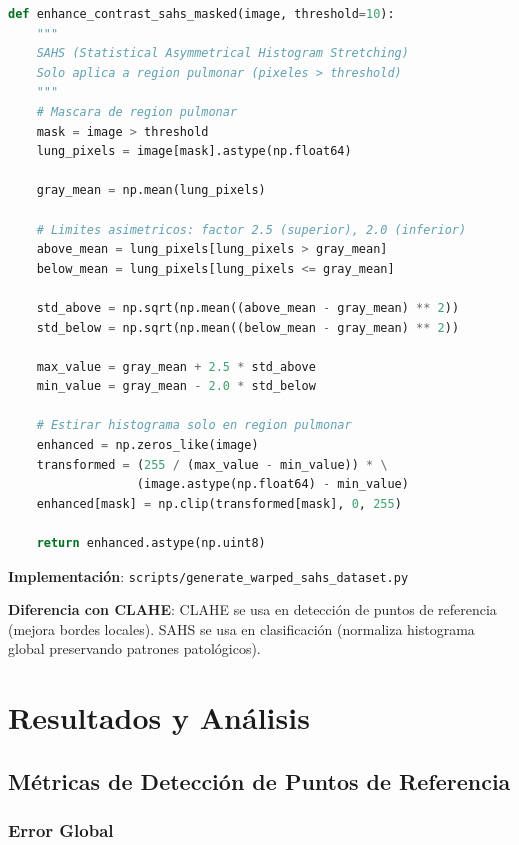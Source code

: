 \documentclass[12pt,a4paper]{article}
\newcommand{\code}[1]{\texttt{#1}}
\begin{document}
\begin{lstlisting}[language=Python]
def enhance_contrast_sahs_masked(image, threshold=10):
    """
    SAHS (Statistical Asymmetrical Histogram Stretching)
    Solo aplica a region pulmonar (pixeles > threshold)
    """
    # Mascara de region pulmonar
    mask = image > threshold
    lung_pixels = image[mask].astype(np.float64)

    gray_mean = np.mean(lung_pixels)

    # Limites asimetricos: factor 2.5 (superior), 2.0 (inferior)
    above_mean = lung_pixels[lung_pixels > gray_mean]
    below_mean = lung_pixels[lung_pixels <= gray_mean]

    std_above = np.sqrt(np.mean((above_mean - gray_mean) ** 2))
    std_below = np.sqrt(np.mean((below_mean - gray_mean) ** 2))

    max_value = gray_mean + 2.5 * std_above
    min_value = gray_mean - 2.0 * std_below

    # Estirar histograma solo en region pulmonar
    enhanced = np.zeros_like(image)
    transformed = (255 / (max_value - min_value)) * \
                  (image.astype(np.float64) - min_value)
    enhanced[mask] = np.clip(transformed[mask], 0, 255)

    return enhanced.astype(np.uint8)
\end{lstlisting}

\textbf{Implementación}: \code{scripts/generate\_warped\_sahs\_dataset.py}

\textbf{Diferencia con CLAHE}: CLAHE se usa en detección de puntos de referencia (mejora bordes locales). SAHS se usa en clasificación (normaliza histograma global preservando patrones patológicos).

\section{Resultados y Análisis}

\subsection{Métricas de Detección de Puntos de Referencia}

\subsubsection{Error Global}
\end{document}
